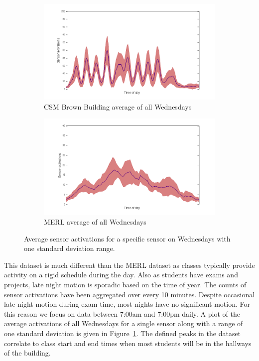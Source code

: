 \documentclass{acm_proc_article-sp}
\begin{document}
\begin{figure}[t!]
\centering
\begin{subfigure}{.45\textwidth}
  \centering
  \includegraphics[width=1.0\linewidth]{brown_day.png}
  \caption{CSM Brown Building average of all Wednesdays}
  \label{fig:csmday}
\end{subfigure}
\begin{subfigure}{.45\textwidth}
  \centering
  \includegraphics[width=1.0\linewidth]{merl_day.png}
  \caption{MERL average of all Wednesdays}
  \label{fig:merlday}
\end{subfigure}
\caption{Average sensor activations for a specific sensor on Wednesdays with one standard deviation range.}
\label{fig:dayplot}
\end{figure}

This dataset is much different than the MERL dataset as classes typically provide activity on a rigid schedule during the day.  Also as students have exams and projects, late night motion is sporadic based on the time of year.  The counts of sensor activations have been aggregated over every 10 minutes.  Despite occasional late night motion during exam time, most nights have no significant motion.  For this reason we focus on data between 7:00am and 7:00pm daily.  A plot of the average activations of all Wednesdays for a single sensor along with a range of one standard deviation is given in Figure~\ref{fig:csmday}.  The defined peaks in the dataset correlate to class start and end times when most students will be in the hallways of the building.
\end{document}
